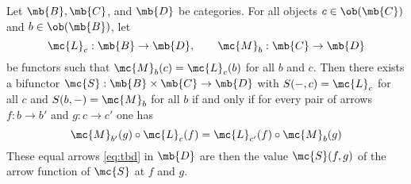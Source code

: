 \documentclass[nocover]{pset}
\begin{document}
\begin{adjustwidth}{1em}{1em}
  \begin{theorem}
    Let $\mb{B}, \mb{C}$, and $\mb{D}$ be categories. For all objects
    $c \in \ob(\mb{C})$ and $b \in \ob(\mb{B})$, let
    \[
      \mc{L}_{c} : \mb{B} \to \mb{D}, \qquad \mc{M}_b : \mb{C} \to
      \mb{D}
    \]
    be functors such that $\mc{M}_b(c) = \mc{L}_c(b)$ for all $b$ and
    $c$. Then there exists a bifunctor $\mc{S} : \mb{B} \times \mb{C}
    \to \mb{D}$ with $S(-, c) = \mc{L}_c$ for all $c$ and $S(b, -) =
    \mc{M}_b$ for all $b$ if and only if for every pair of arrows $f :
    b \to b'$ and $g : c \to c'$ one has
    \begin{equation}
      \mc{M}_{b'}(g) \circ \mc{L}_c(f) = \mc{L}_{c'}(f) \circ
      \mc{M}_b(g) \label{eq:tbd}
    \end{equation}
    These equal arrows \ref{eq:tbd} in $\mb{D}$ are then the value
    $\mc{S}(f,g)$ of the arrow function of $\mc{S}$ at $f$ and $g$.
  \end{theorem}
\end{adjustwidth}
\end{document}
